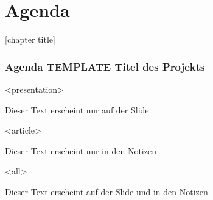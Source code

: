 
\section{Agenda}
{%
[chapter title]
\begin{frame}[fragile]

\frametitle<presentation>{Agenda TEMPLATE Titel des Projekts}





\mode
<presentation>

Dieser Text erscheint nur auf der Slide


\mode
<article>

Dieser Text erscheint nur in den Notizen


\mode
<all>

Dieser Text erscheint auf der Slide und in den Notizen



\end{frame}
}

\newpage

